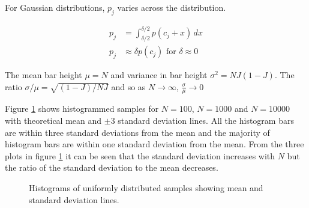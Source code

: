 \documentclass[12pt]{article}
\begin{document}
For Gaussian distributions, $p_j$ varies across the distribution.

\begin{align}
	p_j &= \int_{\delta/2}^{\delta/2}  p(c_j + x) \, dx \\
    p_j &\approx \delta p(c_j) \mbox{ for } \delta \approx 0
\end{align}

The mean bar height  $\mu = N$ and variance in bar height $\sigma^2 = NJ(1-J)$. The ratio $\sigma / \mu = \sqrt {(1-J) / NJ}$ and so as $N \to \infty$, $\frac \sigma \mu \to 0$

Figure \ref{fig:hist-dist} shows histogrammed samples for $N=100$,  $N=1000$ and $N=10000$ with theoretical mean and $\pm 3$ standard deviation lines. All the histogram bars are within three standard deviations from the mean and the majority of histogram bars are within one standard deviation from the mean. From the three plots in figure \ref{fig:hist-dist} it can be seen that the standard deviation increases with $N$ but the ratio of the standard deviation to the mean decreases.

\begin{figure}[H]
  \caption{Histograms of uniformly distributed samples showing mean and standard deviation lines.}
  \label{fig:hist-dist}
\end{figure}
\end{document}

